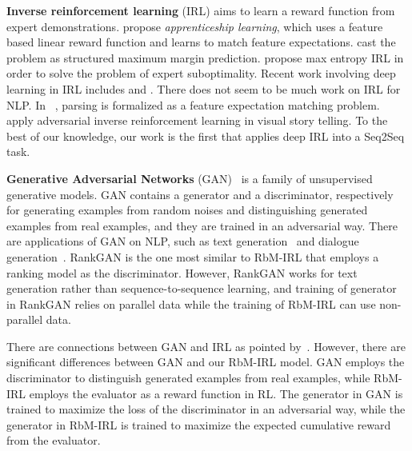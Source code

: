 \documentclass[11pt,a4paper]{article}
\begin{document}
    \textbf{Inverse reinforcement learning} (IRL) aims to learn a reward function from expert demonstrations. \citet{abbeel2004apprenticeship} propose \textit{apprenticeship learning}, which uses a feature based linear reward function and learns to match feature expectations. \citet{ratliff2006maximum} cast the problem as structured maximum margin prediction. \citet{ziebart2008maximum} propose max entropy IRL in order to solve the problem of expert suboptimality. Recent work involving deep learning in IRL includes \citet{finn2016guided} and \citet{ho2016model}. There does not seem to be much work on IRL for NLP. In ~\citet{neu2009training}, parsing is formalized as a feature expectation matching problem. ~\citet{wang2018AREL} apply adversarial inverse reinforcement learning in visual story telling. To the best of our knowledge, our work is the first that applies deep IRL into a Seq2Seq task.

    \textbf{Generative Adversarial Networks} (GAN)~\citep{goodfellow2014generative} is a family of unsupervised generative models. GAN contains a generator and a discriminator, respectively for generating examples from random noises and distinguishing generated examples from real examples, and they are trained in an adversarial way. There are applications of GAN on NLP, such as text generation~\citep{yu2017seqgan,guo2017long} and dialogue generation~\citep{li2017adversarial}. RankGAN \citep{lin2017adversarial} is the one most similar to RbM-IRL that employs a ranking model as the discriminator. However, RankGAN works for text generation rather than sequence-to-sequence learning, and training of generator in RankGAN relies on parallel data while the training of RbM-IRL can use non-parallel data.

    There are connections between GAN and IRL as pointed by~\citet{finn2016connection, ho2016generative}. However, there are significant differences between GAN and our RbM-IRL model. GAN employs the discriminator to distinguish generated examples from real examples, while RbM-IRL employs the evaluator as a reward function in RL. The generator in GAN is trained to maximize the loss of the discriminator in an adversarial way, while the generator in RbM-IRL is trained to maximize the expected cumulative reward from the evaluator.

\vspace{-5pt}
\end{document}
